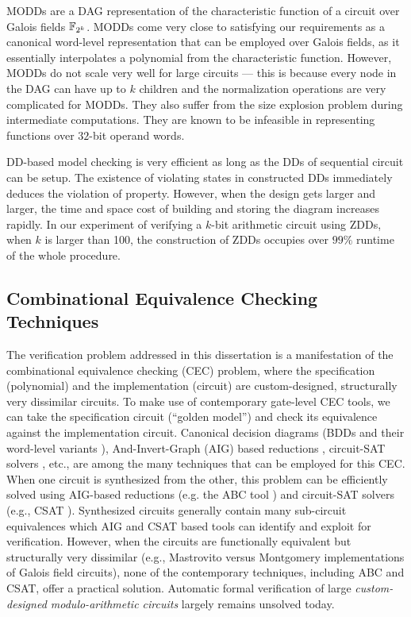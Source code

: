 MODDs \cite{modd} \cite{modd_tcomp} are a DAG representation of the
characteristic function of a circuit over Galois fields ${\mathbb{F}}_{2^k}$. MODDs
come very close to satisfying our requirements as a canonical
word-level representation that can be employed over Galois fields, as
it essentially interpolates a polynomial from the characteristic 
function. However, MODDs do not scale very well for large circuits ---
this is because every node in the DAG can have up to $k$ children and
the normalization operations are very complicated for MODDs. They also
suffer from the size explosion problem during intermediate
computations. They are known to be infeasible in representing
functions over $32$-bit operand words. 


DD-based model checking is very efficient as long as the DDs of sequential 
circuit can be setup. The existence of violating states in constructed DDs 
immediately deduces the violation of property. However, when the design gets
larger and larger, the time and space cost of building and storing the diagram 
increases rapidly. In our experiment of verifying a $k$-bit arithmetic circuit 
using ZDDs, when $k$ is larger than 100, the construction of ZDDs occupies 
over $99\%$ runtime of the whole procedure.
\subsection{Combinational Equivalence Checking Techniques}
The verification problem addressed in this dissertation is a
manifestation of the combinational equivalence checking (CEC) problem,
where the specification (polynomial) and  the implementation (circuit)
are custom-designed, structurally very dissimilar circuits. To make
use of contemporary gate-level CEC tools, we can take the 
specification circuit (``golden model'') and check its equivalence
against the implementation circuit. Canonical decision diagrams (BDDs
\cite{BRYA86} and their word-level variants \cite{WLS}),
And-Invert-Graph (AIG) based reductions \cite{AIG:2002}
\cite{alanmi:cec:iccad2006}, circuit-SAT solvers \cite{csat}, etc.,
are among the many techniques that can be employed for this CEC.  
When one circuit is synthesized from the 
other, this problem can be efficiently solved using AIG-based
reductions (e.g. the ABC tool \cite{abc}) and circuit-SAT solvers
(e.g., CSAT \cite{csat}). 
Synthesized circuits generally contain many
sub-circuit equivalences which AIG and CSAT based tools can identify
and exploit for verification. However, when the circuits are
functionally equivalent but structurally very dissimilar (e.g.,
Mastrovito \cite{mastro:1989} versus Montgomery implementations
\cite{acar:1998} of Galois field circuits), none of the 
  contemporary techniques, including ABC and CSAT, offer a practical
  solution. Automatic formal verification of large {\it
    custom-designed modulo-arithmetic circuits} largely remains
  unsolved today.    

